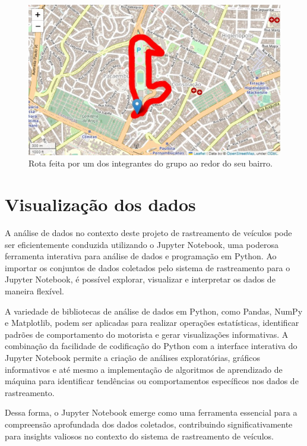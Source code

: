 \begin{figure}[hp]
    \centering
    
    \includegraphics[scale=0.6]{figures/rota.png}
    
    \caption{Rota feita por um dos integrantes do grupo ao redor do seu bairro.}
    
    \label{fig:rota}
\end{figure}

\section{Visualização dos dados}
A análise de dados no contexto deste projeto de rastreamento de veículos pode ser eficientemente conduzida utilizando o Jupyter Notebook, uma poderosa ferramenta interativa para análise de dados e programação em Python. Ao importar os conjuntos de dados coletados pelo sistema de rastreamento para o Jupyter Notebook, é possível explorar, visualizar e interpretar os dados de maneira flexível. 

A variedade de bibliotecas de análise de dados em Python, como Pandas, NumPy e Matplotlib, podem ser aplicadas para realizar operações estatísticas, identificar padrões de comportamento do motorista e gerar visualizações informativas. A combinação da facilidade de codificação do Python com a interface interativa do Jupyter Notebook permite a criação de análises exploratórias, gráficos informativos e até mesmo a implementação de algoritmos de aprendizado de máquina para identificar tendências ou comportamentos específicos nos dados de rastreamento. 

Dessa forma, o Jupyter Notebook emerge como uma ferramenta essencial para a compreensão aprofundada dos dados coletados, contribuindo significativamente para insights valiosos no contexto do sistema de rastreamento de veículos.

